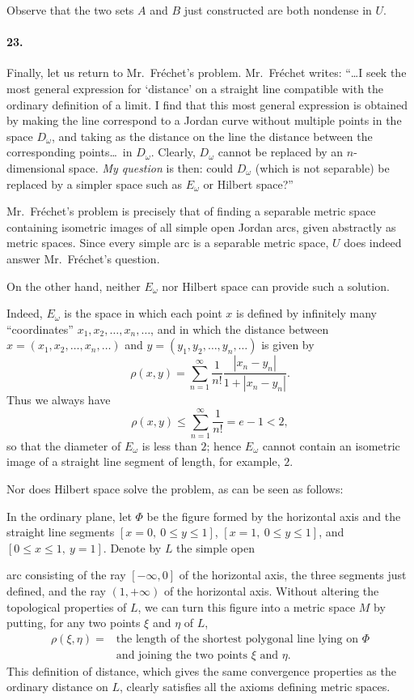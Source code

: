 \documentclass[a4paper,12pt]{amsart}
\newcommand{\srcpage}[1]{} %
\begin{document}
Observe that the two sets $A$ and $B$ just constructed are both nondense in $U$.

\srcpage{88}
\paragraph{23.}
Finally, let us return to Mr.~Fréchet's problem. Mr.~Fréchet writes: ``\ldots I seek the most general expression for `distance' on a straight line compatible with the ordinary definition of a limit. I find that this most general expression is obtained by making the line correspond to a Jordan curve without multiple points in the space $D_\omega$, and taking as the distance on the line the distance between the corresponding points\ldots\ in $D_\omega$. Clearly, $D_\omega$ cannot be replaced by an $n$-dimensional space. \textit{My question} is then: could $D_\omega$ (which is not separable) be replaced by a simpler space such as $E_\omega$ or Hilbert space?''

Mr.~Fréchet's problem is precisely that of finding a separable metric space containing isometric images of all simple open Jordan arcs, given abstractly as metric spaces. Since every simple arc is a separable metric space, $U$ does indeed answer Mr.~Fréchet's question.

On the other hand, neither $E_\omega$ nor Hilbert space can provide such a solution.

Indeed, $E_\omega$ is the space in which each point $x$ is defined by infinitely many ``coordinates'' $x_1,x_2,\ldots,x_n,\ldots$, and in which the distance between $x=(x_1,x_2,\ldots,x_n,\ldots)$ and $y=(y_1,y_2,\ldots,y_n,\ldots)$ is given by
\[\rho(x,y)=\sum_{n=1}^{\infty}\frac1{n!}\frac{|x_n-y_n|}{1+|x_n-y_n|}.\]
Thus we always have
\[\rho(x,y)\le\sum_{n=1}^{\infty}\frac1{n!}=e-1<2,\]
so that the diameter of $E_\omega$ is less than $2$; hence $E_\omega$ cannot contain an isometric image of a straight line segment of length, for example, $2$.

Nor does Hilbert space solve the problem, as can be seen as follows:

In the ordinary plane, let $\Phi$ be the figure formed by the horizontal axis and the straight line segments $[x=0,\ 0\le y\le1]$, $[x=1,\ 0\le y\le1]$, and $[0\le x\le1,\ y=1]$. Denote by $L$ the simple open
\srcpage{89}
arc consisting of the ray $[-\infty,0]$ of the horizontal axis, the three segments just defined, and the ray $(1,+\infty)$ of the horizontal axis. Without altering the topological properties of $L$, we can turn this figure into a metric space $M$ by putting, for any two points $\xi$ and $\eta$ of $L$,
\[
\begin{aligned}
\rho(\xi,\eta)={}&\text{the length of the shortest polygonal line lying on $\Phi$}\\
&\text{and joining the two points $\xi$ and $\eta$.}
\end{aligned}
\]
This definition of distance, which gives the same convergence properties as the ordinary distance on $L$, clearly satisfies all the axioms defining metric spaces.
\end{document}
